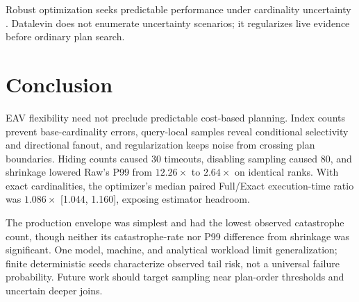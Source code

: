 \documentclass[sigconf]{cidr-2027}
\begin{document}
Robust optimization seeks predictable performance under cardinality
uncertainty \cite{babcock2005robust}. Datalevin does not enumerate uncertainty
scenarios; it regularizes live evidence before ordinary plan search.

\section{Conclusion}

EAV flexibility need not preclude predictable cost-based planning. Index
counts prevent base-cardinality errors, query-local samples reveal conditional
selectivity and directional fanout, and regularization keeps noise from
crossing plan boundaries. Hiding counts caused 30 timeouts, disabling sampling
caused 80, and shrinkage lowered Raw's P99 from
$12.26\times$ to $2.64\times$ on identical ranks. With exact cardinalities,
the optimizer's median paired Full/Exact execution-time ratio was
$1.086\times$ [1.044, 1.160], exposing estimator headroom.

The production envelope was simplest and had the lowest observed catastrophe
count, though neither its catastrophe-rate nor P99 difference from shrinkage
was significant. One model, machine, and analytical workload limit
generalization; finite deterministic seeds characterize observed tail risk,
not a universal failure probability. Future work should target sampling near
plan-order thresholds and uncertain deeper joins.



\end{document}
